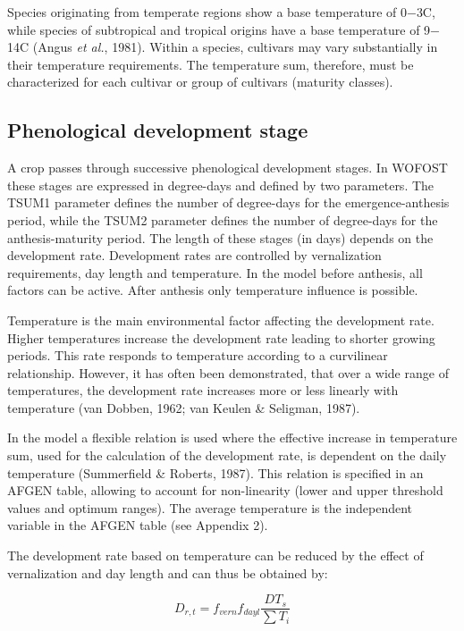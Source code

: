 Species originating from temperate regions show a base temperature of
0$-$3\degrees C, while species of subtropical and tropical origins have a base temperature of
9$-$14\degrees C (Angus {\it et al.}, 1981). Within a species, cultivars may vary substantially 
in their temperature requirements. The temperature sum, therefore, must be characterized for
each cultivar or group of cultivars (maturity classes).   

\subsection{Phenological development stage}
\label{sec:DVS}

A crop passes through successive phenological development stages. In WOFOST these stages 
are expressed in degree-days and defined by two parameters. The TSUM1 parameter defines
the number of degree-days for the emergence-anthesis period, while the TSUM2 parameter
defines the number of degree-days for the anthesis-maturity period. 
The length of these stages (in days) depends on the development rate. Development rates are 
controlled by vernalization requirements, day length and temperature. In the model before
anthesis, all factors can be active. After anthesis only temperature influence is possible.

Temperature is the main environmental factor affecting the development rate. Higher
temperatures increase the development rate leading to shorter growing periods. This rate
responds to temperature according to a curvilinear relationship. However, it has often
been demonstrated, that over a wide range of temperatures, the development rate
increases more or less linearly with temperature (van Dobben, 1962; van Keulen \&
Seligman, 1987).

In the model a flexible relation is used where the effective increase in temperature
sum, used for the calculation of the development rate, is dependent on the daily temperature 
(Summerfield \& Roberts, 1987). This relation is specified in an AFGEN table, 
allowing to account for non-linearity (lower and upper threshold values and optimum
ranges). The average temperature is the independent variable in the AFGEN table (see
Appendix 2). 

The development rate based on temperature can be reduced by the effect of vernalization and 
day length and can thus be obtained by:

\begin{equation}
\label{eq:5.3}
D_{r,t} = {f_{vern}}{f_{dayl}}{\frac{DT_{s}}{\sum T_{i}}}
\end{equation}

